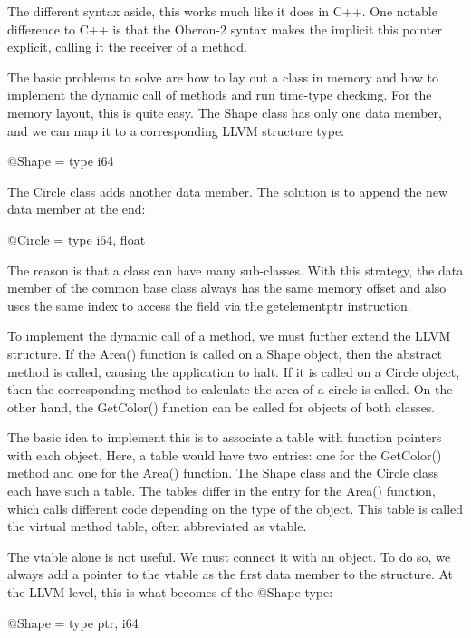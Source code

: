 The different syntax aside, this works much like it does in C++. One notable difference to C++ is that the Oberon-2 syntax makes the implicit this pointer explicit, calling it the receiver of a method.

The basic problems to solve are how to lay out a class in memory and how to implement the dynamic call of methods and run time-type checking. For the memory layout, this is quite easy. The Shape class has only one data member, and we can map it to a corresponding LLVM structure type:

\begin{shell}
@Shape = type { i64 }
\end{shell}

The Circle class adds another data member. The solution is to append the new data member at the end:

\begin{shell}
@Circle = type { i64, float }
\end{shell}


The reason is that a class can have many sub-classes. With this strategy, the data member of the common base class always has the same memory offset and also uses the same index to access the field via the getelementptr instruction.

To implement the dynamic call of a method, we must further extend the LLVM structure. If the Area() function is called on a Shape object, then the abstract method is called, causing the application to halt. If it is called on a Circle object, then the corresponding method to calculate the area of a circle is called. On the other hand, the GetColor() function can be called for objects of both classes.

The basic idea to implement this is to associate a table with function pointers with each object. Here, a table would have two entries: one for the GetColor() method and one for the Area() function. The Shape class and the Circle class each have such a table. The tables differ in the entry for the Area() function, which calls different code depending on the type of the object. This table is called the virtual method table, often abbreviated as vtable.

The vtable alone is not useful. We must connect it with an object. To do so, we always add a pointer to the vtable as the first data member to the structure. At the LLVM level, this is what becomes of the @Shape type:

\begin{shell}
@Shape = type { ptr, i64 }
\end{shell}

